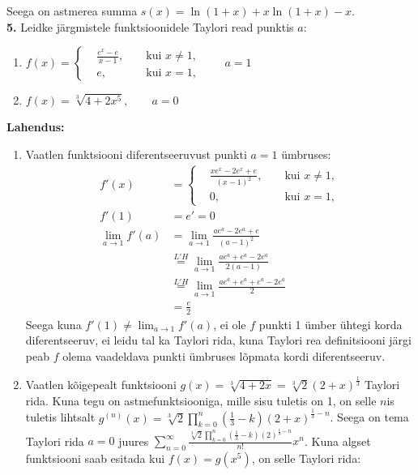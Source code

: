 \documentclass{article}
\begin{document}
Seega on astmerea summa $s(x)=\ln(1+x)+x\ln(1+x)-x$.
\pagebreak\\
\textbf{5.} Leidke j\"argmistele funktsioonidele Taylori read punktis $a$:\\
\begin{enumerate}
\item $f(x)=\left\{\begin{aligned}
&\frac{e^x-e}{x-1}, && \text{ kui } x\neq1,\\
&e, && \text{ kui } x=1,
\end{aligned}\right.\qquad a=1$
\item $f(x)=\sqrt[3]{4+2x^5},\qquad a=0$\\
\end{enumerate}
\textbf{Lahendus:}\\
\begin{enumerate}
\item Vaatlen funktsiooni diferentseeruvust punkti $a=1$ \"umbruses:
\begin{equation*}
\begin{aligned}
f'(x)&=\left\{\begin{aligned}
&\frac{xe^x-2e^x+e}{(x-1)^2}, && \text{ kui } x\neq1,\\
&0, && \text{ kui } x=1,
\end{aligned}\right.\\
f'(1)&=e'=0\\
\lim_{a\to1}f'(a)&=\lim_{a\to1}\frac{ae^a-2e^a+e}{(a-1)^2}\\
&\stackrel{L'H}{=}\lim_{a\to1}\frac{ae^a+e^a-2e^a}{2(a-1)}\\
&\stackrel{L'H}{=}\lim_{a\to1}\frac{ae^a+e^a+e^a-2e^a}{2}\\
&=\frac{e}{2}
\end{aligned}
\end{equation*}
Seega kuna $f'(1)\neq\lim_{a\to 1}f'(a)$, ei ole $f$ punkti 1 \"umber \"uhtegi korda diferentseeruv, ei leidu tal ka Taylori rida, kuna Taylori rea definitsiooni j\"argi peab $f$ olema vaadeldava punkti \"umbruses l\~opmata kordi diferentseeruv.
\item Vaatlen k\~oigepealt funktsiooni $g(x)=\sqrt[3]{4+2x}=\sqrt[3]{2}(2+x)^{\frac{1}{3}}$ Taylori rida. Kuna tegu on astmefunktsiooniga, mille sisu tuletis on 1, on selle $n$is tuletis lihtsalt $g^{(n)}(x)=\sqrt[3]{2}\prod_{k=0}^n(\frac{1}{3}-k)(2+x)^{\frac{1}{3}-n}$. Seega on tema Taylori rida $a=0$ juures $\sum_{n=0}^\infty\frac{\sqrt[3]{2}\displaystyle\prod_{k=0}^n(\frac{1}{3}-k)(2)^{\frac{1}{3}-n}}{n!}x^n$. Kuna algset funktsiooni saab esitada kui $f(x)=g(x^5)$, on selle Taylori rida:

\end{enumerate}
\end{document}
